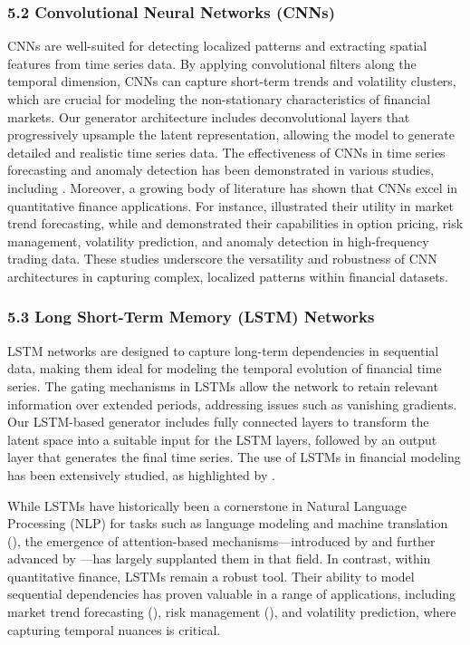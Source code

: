 \documentclass{article}
\begin{document}
\subsubsection*{5.2 Convolutional Neural Networks (CNNs)}

CNNs are well-suited for detecting localized patterns and extracting spatial features from time series data. By applying convolutional filters along the temporal dimension, CNNs can capture short-term trends and volatility clusters, which are crucial for modeling the non-stationary characteristics of financial markets. Our generator architecture includes deconvolutional layers that progressively upsample the latent representation, allowing the model to generate detailed and realistic time series data. The effectiveness of CNNs in time series forecasting and anomaly detection has been demonstrated in various studies, including \textcite{lecun_deep_2015}. Moreover, a growing body of literature has shown that CNNs excel in quantitative finance applications. For instance, \textcite{dixon_high_2017} illustrated their utility in market trend forecasting, while \textcite{liu_option_2023} and \textcite{zhang_deeplob_2019} demonstrated their capabilities in option pricing, risk management, volatility prediction, and anomaly detection in high-frequency trading data. These studies underscore the versatility and robustness of CNN architectures in capturing complex, localized patterns within financial datasets.

\subsubsection*{5.3 Long Short-Term Memory (LSTM) Networks}

LSTM networks are designed to capture long-term dependencies in sequential data, making them ideal for modeling the temporal evolution of financial time series. The gating mechanisms in LSTMs allow the network to retain relevant information over extended periods, addressing issues such as vanishing gradients. Our LSTM-based generator includes fully connected layers to transform the latent space into a suitable input for the LSTM layers, followed by an output layer that generates the final time series. The use of LSTMs in financial modeling has been extensively studied, as highlighted by \textcite{hochreiter_long_1997}.

While LSTMs have historically been a cornerstone in Natural Language Processing (NLP) for tasks such as language modeling and machine translation (\textcite{sutskever_sequence_2014, fischer_deep_2018}), the emergence of attention-based mechanisms—introduced by \textcite{bahdanau_neural_2016} and further advanced by \textcite{vaswani_attention_2023}—has largely supplanted them in that field. In contrast, within quantitative finance, LSTMs remain a robust tool. Their ability to model sequential dependencies has proven valuable in a range of applications, including market trend forecasting (\textcite{fischer_deep_2018}), risk management (\textcite{bao_deep_2017}), and volatility prediction, where capturing temporal nuances is critical.
\end{document}
